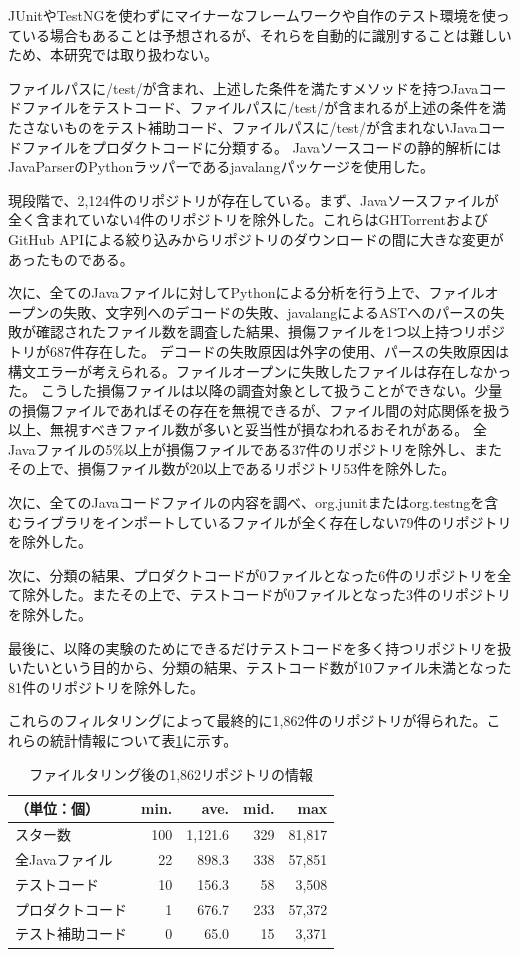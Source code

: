 \documentclass[conference]{IEEEtran}
\begin{document}
JUnitやTestNGを使わずにマイナーなフレームワークや自作のテスト環境を使っている場合もあることは予想されるが、それらを自動的に識別することは難しいため、本研究では取り扱わない。

ファイルパスに/test/が含まれ、上述した条件を満たすメソッドを持つJavaコードファイルをテストコード、ファイルパスに/test/が含まれるが上述の条件を満たさないものをテスト補助コード、ファイルパスに/test/が含まれないJavaコードファイルをプロダクトコードに分類する。
Javaソースコードの静的解析にはJavaParserのPythonラッパーであるjavalangパッケージを使用した。

現段階で、2,124件のリポジトリが存在している。まず、Javaソースファイルが全く含まれていない4件のリポジトリを除外した。これらはGHTorrentおよび
GitHub APIによる絞り込みからリポジトリのダウンロードの間に大きな変更があったものである。

次に、全てのJavaファイルに対してPythonによる分析を行う上で、ファイルオープンの失敗、文字列へのデコードの失敗、javalangによるASTへのパースの失敗が確認されたファイル数を調査した結果、損傷ファイルを1つ以上持つリポジトリが687件存在した。
デコードの失敗原因は外字の使用、パースの失敗原因は構文エラーが考えられる。ファイルオープンに失敗したファイルは存在しなかった。
こうした損傷ファイルは以降の調査対象として扱うことができない。少量の損傷ファイルであればその存在を無視できるが、ファイル間の対応関係を扱う以上、無視すべきファイル数が多いと妥当性が損なわれるおそれがある。
全Javaファイルの5\%以上が損傷ファイルである37件のリポジトリを除外し、またその上で、損傷ファイル数が20以上であるリポジトリ53件を除外した。

次に、全てのJavaコードファイルの内容を調べ、org.junitまたはorg.testngを含むライブラリをインポートしているファイルが全く存在しない79件のリポジトリを除外した。

次に、分類の結果、プロダクトコードが0ファイルとなった6件のリポジトリを全て除外した。またその上で、テストコードが0ファイルとなった3件のリポジトリを除外した。

最後に、以降の実験のためにできるだけテストコードを多く持つリポジトリを扱いたいという目的から、分類の結果、テストコード数が10ファイル未満となった81件のリポジトリを除外した。

これらのフィルタリングによって最終的に1,862件のリポジトリが得られた。これらの統計情報について表\ref{tab:repos}に示す。

\begin{table}[t]
  \caption{ファイルタリング後の1,862リポジトリの情報}
  \label{tab:repos}
  \centering
  \begin{tabular}{lrrrr} 
    \hline
   （単位：個） & min. & ave. & mid. & max \\ \hline
    スター数 & 100 & 1,121.6 & 329 & 81,817 \\
    全Javaファイル & 22 & 898.3 & 338 & 57,851 \\
    テストコード & 10 & 156.3 & 58 & 3,508 \\
    プロダクトコード & 1 & 676.7 & 233 & 57,372 \\
    テスト補助コード & 0 & 65.0 & 15 & 3,371 \\ \hline    
  \end{tabular}
\end{table}
\end{document}
